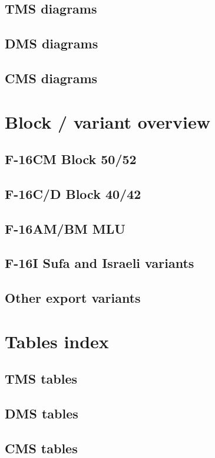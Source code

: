 \documentclass[11pt,a4paper]{article}
\begin{document}
\subsection{TMS diagrams}

\subsection{DMS diagrams}

\subsection{CMS diagrams}


\appendix

\section{Block / variant overview}

\subsection{F-16CM Block 50/52}

\subsection{F-16C/D Block 40/42}

\subsection{F-16AM/BM MLU}

\subsection{F-16I Sufa and Israeli variants}

\subsection{Other export variants}

\section{Tables index}

\subsection{TMS tables}

\subsection{DMS tables}

\subsection{CMS tables}

\end{document}

